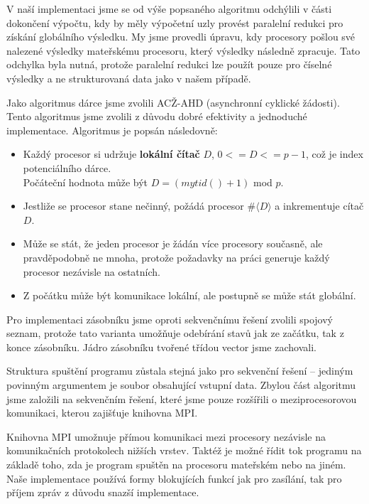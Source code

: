 \documentclass[12pt]{article}
\begin{document}
V naší implementaci jsme se od výše popsaného algoritmu odchýlili v části dokončení výpočtu,
kdy by měly výpočetní uzly provést paralelní redukci pro získání globálního výsledku.
My jsme provedli úpravu, kdy procesory pošlou své nalezené výsledky mateřskému procesoru, který výsledky
následně zpracuje. Tato odchylka byla nutná, protože paralelní redukci lze použít pouze pro číselné výsledky 
a ne strukturovaná data jako v našem případě.

Jako algoritmus dárce jsme zvolili ACŽ-AHD (asynchronní cyklické žádosti). 
Tento algoritmus jsme zvolili z důvodu dobré efektivity a jednoduché implementace.
Algoritmus je popsán následovně:

\begin{itemize}
  \item{Každý procesor si udržuje \textbf{lokální čítač} $D$, 
  $0 <= D <= p - 1$, což je index potenciálního dárce.\\
    Počáteční hodnota může být $D = (mytid() + 1)$ mod $p$.}
  \item{Jestliže se procesor stane nečinný, požádá procesor $\#\langle D \rangle$ a inkrementuje cítač $D$.}
  \item{Může se stát, že jeden procesor je žádán více procesory současně, ale pravděpodobně ne mnoha, protože
  požadavky na práci generuje každý procesor nezávisle na ostatních.}
  \item{Z počátku může být komunikace lokální, ale postupně se může stát globální.}
\end{itemize}

Pro implementaci zásobníku jsme oproti sekvenčnímu řešení zvolili spojový seznam, 
protože tato varianta umožňuje odebírání stavů jak ze začátku, tak z konce zásobníku.
Jádro zásobníku tvořené třídou vector jsme zachovali.

Struktura spuštění programu zůstala stejná jako pro sekvenční řešení -- 
jediným povinným argumentem je soubor obsahující vstupní data.
Zbylou část algoritmu jsme založili na sekvenčním řešení, které jsme
pouze rozšířili o meziprocesorovou komunikaci, kterou zajišťuje knihovna MPI.

Knihovna MPI umožnuje přímou komunikaci mezi procesory nezávisle na komunikačních protokolech nižších vrstev.
Taktéž je možné řídit tok programu na základě toho, zda je program spuštěn na 
procesoru mateřském nebo na jiném.
Naše implementace používá formy blokujících funkcí jak pro zasílání, tak pro příjem zpráv z důvodu snazší implementace.

\end{document}
